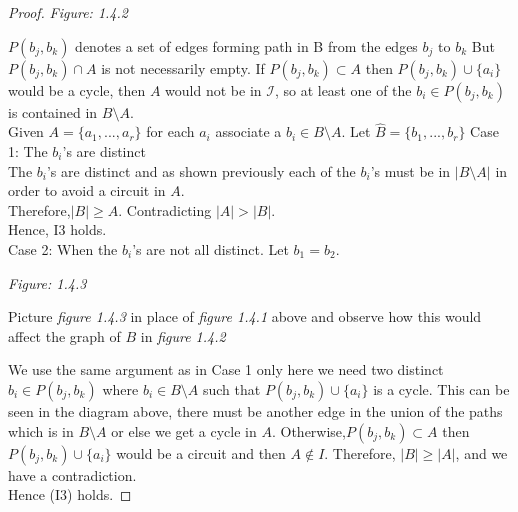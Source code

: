 \documentclass[../main.tex]{subfiles}
\begin{document}
\begin{proof}
\begin{minipage}{.2\textwidth}
\textit{Figure: 1.4.2}
 \end{minipage}
 
 \vspace{2mm}
 
 \noindent\Notation $P( b_j, b_k )$ denotes a set of edges forming path in B from the edges $ b_j $ to $ b_k $
\noindent But $ P(b_j,b_k) \cap A $ is not necessarily empty. If $P(b_j,b_k) \subset A$ then $P(b_j,b_k) \cup \{ a_i \}$  would be a cycle, then $A$ would not be in $\mathcal{I}$, so at least one of the $b_i \in P(b_j,b_k)$ is contained in $B \setminus A.$\\
\noindent Given $A = \{a_1, ... ,a_r\} $ for each $a_i$ associate a $b_i \in B \setminus A$. Let $\hat{B} = \{b_1, ... ,b_r\}$ 
\noindent Case 1: The $ b_i$'s are distinct\\
 The $b_i$'s are distinct and as shown previously each of the $b_i$'s must be in $|B \setminus A|$ in order to avoid a circuit in $A$.\\ 
\noindent Therefore,$|B| \geqslant A$. Contradicting $|A|>|B|.$\\
\noindent Hence, I3 holds.\\
\noindent Case 2: When the $b_i$'s are not all distinct.
\noindent Let $ b_1 = b_2 $.

\vspace{3mm}

\begin{minipage}{.2\textwidth}
\textit{Figure: 1.4.3}
\end{minipage}
\hspace{2.5cm} \begin{minipage}{.6\textwidth}
Picture \textit{figure 1.4.3} in place of \textit{figure 1.4.1} above and observe how this would affect the graph of $B$ in \textit{figure 1.4.2}
 \end{minipage}
\noindent We use the same argument as in Case 1 only here we need two distinct $b_i \in P( b_j, b_k)$ where $b_i \in B \setminus A$ such that  $P(b_j , b_k ) \cup \{ a_i \}$ is a cycle. This can be seen in the diagram above, there must be another edge in the union of the paths which is in $B \setminus A$ or else we get a cycle in $A.$ Otherwise,$P(b_j,b_k) \subset A$ then $P(b_j,b_k) \cup \{ a_i \}$  would be a circuit and then $A \notin I.$ Therefore, $|B| \geq |A|$, and we have a contradiction.\\
\noindent Hence (I3) holds.
\end{proof}
 
\end{document}
